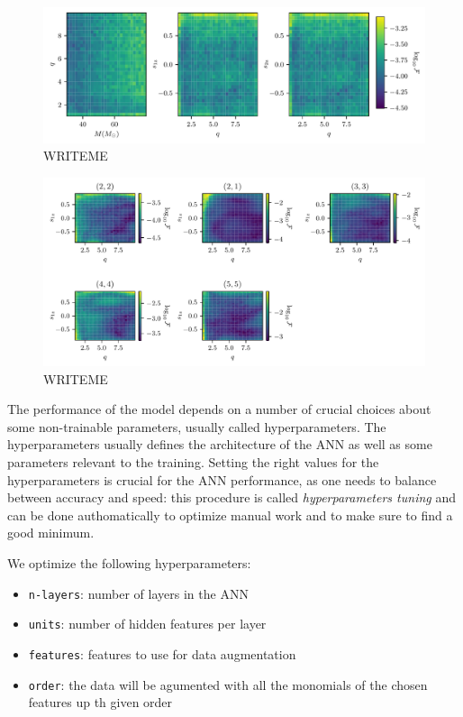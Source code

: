 \documentclass[twocolumn,showpacs,preprintnumbers,nofootinbib,prd,
superscriptaddress,10pt]{revtex4-1}
\begin{document}
\begin{figure}[t]
	\centering
	\includegraphics[width=\textwidth]{colormesh}
	\caption{WRITEME}
	\label{fig:countour_plots}
\end{figure}

\begin{figure}[t]
	\centering
	\includegraphics[width=\textwidth]{colormesh_modes}
	\caption{WRITEME}
	\label{fig:countour_plots_modes}
\end{figure}

The performance of the model depends on a number of crucial choices about some non-trainable parameters, usually called hyperparameters. The hyperparameters usually defines the architecture of the ANN as well as some parameters relevant to the training.
Setting the right values for the hyperparameters is crucial for the ANN performance, as one needs to balance between accuracy and speed: this procedure is called {\it hyperparameters tuning} and can be done authomatically to optimize manual work and to make sure to find a good minimum.

We optimize the following hyperparameters:
\begin{multicols}{2}
	\begin{itemize}
		\item \texttt{n-layers}: number of layers in the ANN
		\item \texttt{units}: number of hidden features per layer
		\item \texttt{features}: features to use for data augmentation
		\item \texttt{order}: the data will be agumented with all the monomials of the chosen features up th given order
	\end{itemize}
\end{multicols}
\end{document}
